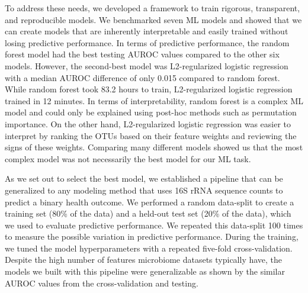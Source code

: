 \documentclass[11pt,]{article}
\begin{document}
To address these needs, we developed a framework to train rigorous,
transparent, and reproducible models. We benchmarked seven ML models and
showed that we can create models that are inherently interpretable and
easily trained without losing predictive performance. In terms of
predictive performance, the random forest model had the best testing
AUROC values compared to the other six models. However, the second-best
model was L2-regularized logistic regression with a median AUROC
difference of only 0.015 compared to random forest. While random forest
took 83.2 hours to train, L2-regularized logistic regression trained in
12 minutes. In terms of interpretability, random forest is a complex ML
model and could only be explained using post-hoc methods such as
permutation importance. On the other hand, L2-regularized logistic
regression was easier to interpret by ranking the OTUs based on their
feature weights and reviewing the signs of these weights. Comparing many
different models showed us that the most complex model was not
necessarily the best model for our ML task.

As we set out to select the best model, we established a pipeline that
can be generalized to any modeling method that uses 16S rRNA sequence
counts to predict a binary health outcome. We performed a random
data-split to create a training set (80\% of the data) and a held-out
test set (20\% of the data), which we used to evaluate predictive
performance. We repeated this data-split 100 times to measure the
possible variation in predictive performance. During the training, we
tuned the model hyperparameters with a repeated five-fold
cross-validation. Despite the high number of features microbiome
datasets typically have, the models we built with this pipeline were
generalizable as shown by the similar AUROC values from the
cross-validation and testing.
\end{document}
